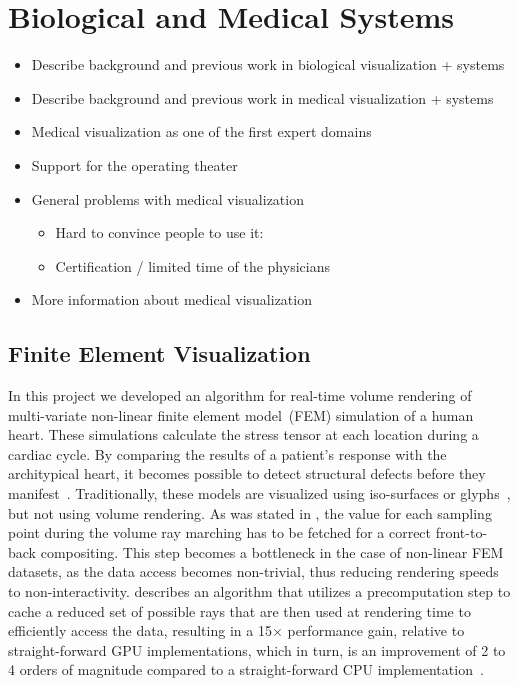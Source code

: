 \section{Biological and Medical Systems}
\label{contributions:medbio}
\begin{itemize}
\item Describe background and previous work in biological visualization + systems
\item Describe background and previous work in medical visualization + systems
\item Medical visualization as one of the first expert domains
\item Support for the operating theater
\item General problems with medical visualization
\begin{itemize}
    \item Hard to convince people to use it:
    \item Certification / limited time of the physicians
\end{itemize}
\item More information about medical visualization \cite{preim2007visualization}
\end{itemize}

\subsection{Finite Element Visualization}
\label{contributions:medbio:fem}
In this project we developed an algorithm for real-time volume rendering of multi-variate non-linear finite element model~(FEM) simulation of a human heart. These simulations calculate the stress tensor at each location during a cardiac cycle. By comparing the results of a patient's response with the architypical heart, it becomes possible to detect structural defects before they manifest~\cite{young1992three, young1995tracking}. Traditionally, these models are visualized using iso-surfaces or glyphs~\cite{wunsche2003visualization}, but not using volume rendering. As was stated in , the value for each sampling point during the volume ray marching has to be fetched for a correct front-to-back compositing. This step becomes a bottleneck in the case of non-linear FEM datasets, as the data access becomes non-trivial, thus reducing rendering speeds to non-interactivity.  describes an algorithm that utilizes a precomputation step to cache a reduced set of possible rays that are then used at rendering time to efficiently access the data, resulting in a 15$\times$ performance gain, relative to straight-forward GPU implementations, which in turn, is an improvement of 2 to 4 orders of magnitude compared to a straight-forward CPU implementation~\cite{Liu12Fem}. 

